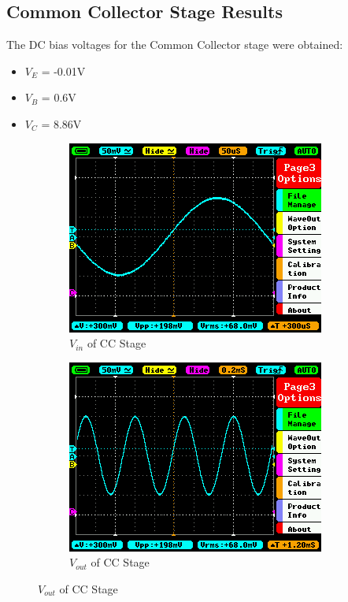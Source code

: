 \documentclass[12pt]{article}
\begin{document}
\subsection{Common Collector Stage Results}
The DC bias voltages for the Common Collector stage were obtained:
\begin{itemize}
    \item $V_E$ = -0.01V
    \item $V_B$ = 0.6V
    \item $V_C$ = 8.86V
\end{itemize}

\begin{figure}[H]
\centering
    \begin{subfigure}{.45\textwidth}
      \centering
      \includegraphics[width=\linewidth]{Lab2/CC_Vin.png}  
      \caption{$V_{in}$ of CC Stage}
    \end{subfigure}
    \begin{subfigure}{.45\textwidth}
      \centering
      \includegraphics[width=\linewidth]{Lab2/CC_Vout.png}  
      \caption{$V_{out}$ of CC Stage}
    \end{subfigure}
\end{figure}
\end{document}
